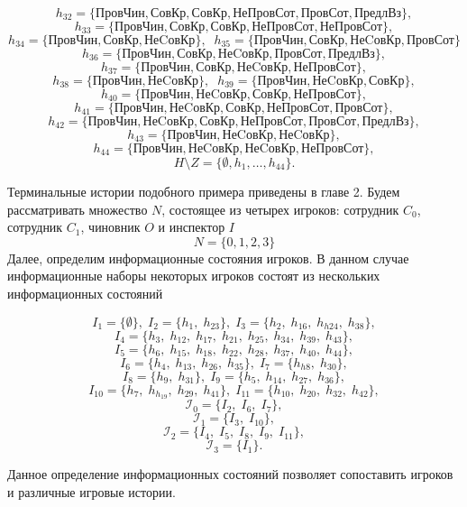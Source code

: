 $$	h_{32} = \{\text{ПровЧин}, \text{СовКр}, \text{СовКр}, \text{НеПровСот}, \text{ПровСот}, \text{ПредлВз}\}, $$
$$	h_{33} = \{\text{ПровЧин}, \text{СовКр}, \text{СовКр}, \text{НеПровСот}, \text{НеПровСот}\}, $$
$$	h_{34} = \{\text{ПровЧин}, \text{СовКр}, \text{НеCовКр}\},\;\;h_{35} = \{\text{ПровЧин}, \text{СовКр}, \text{НеCовКр}, \text{ПровСот}\} $$
$$	h_{36} = \{\text{ПровЧин}, \text{СовКр}, \text{НеCовКр}, \text{ПровСот}, \text{ПредлВз}\}, $$
$$	h_{37} = \{\text{ПровЧин}, \text{СовКр}, \text{НеCовКр}, \text{НеПровСот}\}, $$
$$	h_{38} = \{\text{ПровЧин}, \text{НеCовКр}\},\;\;h_{39} = \{\text{ПровЧин}, \text{НеCовКр}, \text{СовКр}\}, $$
$$	h_{40} = \{\text{ПровЧин}, \text{НеCовКр}, \text{СовКр}, \text{НеПровСот}\}, $$
$$	h_{41} = \{\text{ПровЧин}, \text{НеCовКр}, \text{СовКр}, \text{НеПровСот}, \text{ПровСот}\}, $$
$$	h_{42} = \{\text{ПровЧин}, \text{НеCовКр}, \text{СовКр}, \text{НеПровСот}, \text{ПровСот}, \text{ПредлВз}\}, $$
$$	h_{43} = \{\text{ПровЧин}, \text{НеCовКр}, \text{НеCовКр}\}, $$
$$	h_{44} = \{\text{ПровЧин}, \text{НеCовКр}, \text{НеCовКр}, \text{НеПровСот}\}, $$
\begin{equation}
	\label{HmZ2}
	H \setminus Z = \{\emptyset, h_{1}, \dots , h_{44}\}.
\end{equation}

\par
Терминальные истории подобного примера приведены в главе 2. Будем рассматривать множество $N$, состоящее из четырех игроков: сотрудник $C_0$, сотрудник $C_1$, чиновник $O$ и инспектор $I$
\begin{equation*}
	N = \{0, 1, 2, 3\}
\end{equation*}
Далее, определим информационные состояния игроков. В данном случае информационные наборы некоторых игроков состоят из нескольких информационных состояний

 $$	I_1 = \{\emptyset\},\; I_2 = \{h_{1},\; h_{23}\},\;	I_3 = \{h_{2},\; h_{16},\; h_{h24},\; h_{38}\},  $$
 $$	I_4 = \{h_{3},\;h_{12},\;h_{17},\;h_{21},\;h_{25},\;h_{34},\;h_{39},\;h_{43}\}, $$
 $$	I_5 = \{h_{6},\;h_{15},\;h_{18},\;h_{22},\;h_{28},\;h_{37},\;h_{40},\;h_{44}\}, $$
 $$	I_6 = \{h_{4},\;h_{13},\;h_{26},\;h_{35}\},\; I_7 = \{h_{h8},\; h_{30}\},$$
 $$	I_8 = \{h_{9},\;h_{31}\},\;I_9 = \{h_{5},\;h_{14},\;h_{27},\;h_{36}\},  $$
 $$	I_{10} = \{h_{7},\;h_{h_19},\;h_{29},\;h_{41}\},\;I_{11} = \{h_{10},\;h_{20},\;h_{32},\;h_{42}\}, $$
 $$	\mathcal{I}_0 = \{I_2,\;I_6,\;I_7\},  $$
 $$	\mathcal{I}_1 = \{I_3,\;I_{10}\},  $$
 $$	\mathcal{I}_2 = \{I_4,\;I_5,\;I_8,\;I_9,\;I_{11}\},  $$
 $$	\mathcal{I}_3 = \{I_1\}. $$
\par
Данное определение информационных состояний позволяет сопоставить игроков и различные игровые истории.


